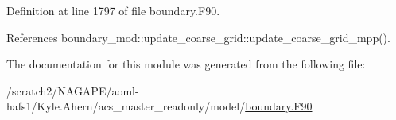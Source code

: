 Definition at line 1797 of file boundary.\-F90.



References boundary\-\_\-mod\-::update\-\_\-coarse\-\_\-grid\-::update\-\_\-coarse\-\_\-grid\-\_\-mpp().



The documentation for this module was generated from the following file\-:\begin{DoxyCompactItemize}
\item 
/scratch2/\-N\-A\-G\-A\-P\-E/aoml-\/hafs1/\-Kyle.\-Ahern/acs\-\_\-master\-\_\-readonly/model/\hyperlink{boundary_8F90}{boundary.\-F90}\end{DoxyCompactItemize}
